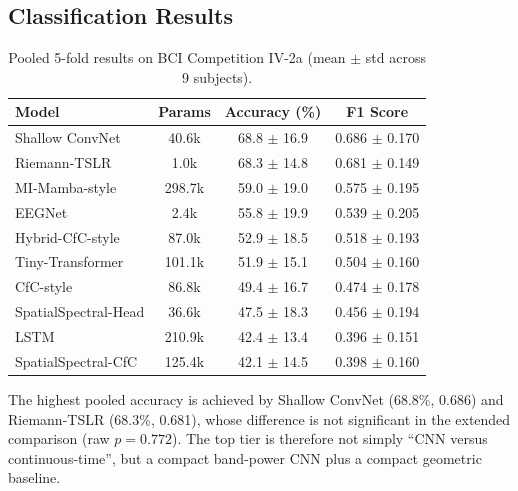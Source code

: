 \documentclass[journal]{IEEEtran}
\begin{document}
\subsection{Classification Results}
\begin{table}[t]
  \centering
  \footnotesize
  \caption{Pooled 5-fold results on BCI Competition IV-2a (mean $\pm$ std across 9 subjects).}
  \begin{tabular}{lccc}
    \toprule
    \textbf{Model} & \textbf{Params} & \textbf{Accuracy (\%)} & \textbf{F1 Score} \\
    \midrule
    Shallow ConvNet \cite{schirrmeister2017deep} & 40.6k & 68.8 $\pm$ 16.9 & 0.686 $\pm$ 0.170 \\
    Riemann-TSLR & 1.0k & 68.3 $\pm$ 14.8 & 0.681 $\pm$ 0.149 \\
    MI-Mamba-style & 298.7k & 59.0 $\pm$ 19.0 & 0.575 $\pm$ 0.195 \\
    EEGNet \cite{lawhern2018eegnet} & 2.4k & 55.8 $\pm$ 19.9 & 0.539 $\pm$ 0.205 \\
    Hybrid-CfC-style & 87.0k & 52.9 $\pm$ 18.5 & 0.518 $\pm$ 0.193 \\
    Tiny-Transformer & 101.1k & 51.9 $\pm$ 15.1 & 0.504 $\pm$ 0.160 \\
    CfC-style & 86.8k & 49.4 $\pm$ 16.7 & 0.474 $\pm$ 0.178 \\
    SpatialSpectral-Head & 36.6k & 47.5 $\pm$ 18.3 & 0.456 $\pm$ 0.194 \\
    LSTM \cite{hochreiter1997long} & 210.9k & 42.4 $\pm$ 13.4 & 0.396 $\pm$ 0.151 \\
    SpatialSpectral-CfC & 125.4k & 42.1 $\pm$ 14.5 & 0.398 $\pm$ 0.160 \\
    \bottomrule
  \end{tabular}
  \label{tab:results}
\end{table}

The highest pooled accuracy is achieved by Shallow ConvNet (68.8\%, 0.686) and Riemann-TSLR (68.3\%, 0.681), whose difference is not significant in the extended comparison (raw $p = 0.772$). The top tier is therefore not simply ``CNN versus continuous-time'', but a compact band-power CNN plus a compact geometric baseline.
\end{document}
